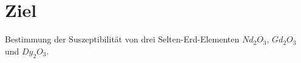 \section{Ziel}
\label{sec:ziel}

Bestimmung der Suszeptibilität von drei Selten-Erd-Elementen $Nd_2O_3$, $Gd_2O_3$ und $Dy_2O_3$.